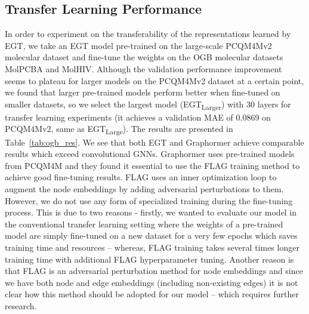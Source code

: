 \documentclass[sigconf,authorversion]{acmart}
\begin{document}
\subsection{Transfer Learning Performance}
In order to experiment on the transferability of the representations learned by EGT, we take an EGT model pre-trained on the large-scale PCQM4Mv2 molecular dataset and fine-tune the weights on the OGB molecular datasets MolPCBA and MolHIV. Although the validation performance improvement seems to plateau for larger models on the PCQM4Mv2 dataset at a certain point, we found that larger pre-trained models perform better when fine-tuned on smaller datasets, so we select the largest model (EGT\textsubscript{Larger}) with 30 layers for transfer learning experiments (it achieves a validation MAE of 0.0869 on PCQM4Mv2, same as EGT\textsubscript{Large}). The results are presented in Table~\ref{tab:ogb_res}. We see that both EGT and Graphormer achieve comparable results which exceed convolutional GNNs. Graphormer uses pre-trained models from PCQM4M and they found it essential to use the FLAG training method \cite{kong2020flag} to achieve good fine-tuning results. FLAG uses an inner optimization loop to augment the node embeddings by adding adversarial perturbations to them. However, we do not use any form of specialized training during the fine-tuning process. This is due to two reasons - firstly, we wanted to evaluate our model in the conventional transfer learning setting where the weights of a pre-trained model are simply fine-tuned on a new dataset for a very few epochs which saves training time and resources -- whereas, FLAG training takes several times longer training time with additional FLAG hyperparameter tuning. Another reason is that FLAG is an adversarial perturbation method for node embeddings and since we have both node and edge embeddings (including non-existing edges) it is not clear how this method should be adopted for our model -- which requires further research.
\end{document}
